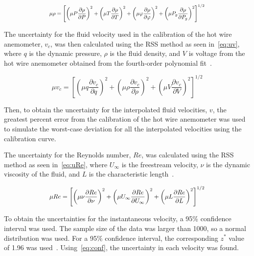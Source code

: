 \documentclass[journal,letterpaper]{IEEEtran}
\begin{document}
\begin{equation} \label{eq:uRho}
    \resizebox{227pt}{!}{$\displaystyle{\mu \rho = \left[\left(\mu P \frac{\partial \rho}{\partial P}\right)^2 + \left(\mu T \frac{\partial \rho}{\partial T}\right)^2 + \left(\mu \varphi \frac{\partial \rho}{\partial \varphi}\right)^2 + \left(\mu P_g \frac{\partial \rho}{\partial P_g}\right)^2\right]^{1/2}}$}
\end{equation}

The uncertainty for the fluid velocity used in the calibration of the hot wire anemometer, $v_c$, was then calculated using the RSS method as seen in~\eqref{eq:uv}, where $q$ is the dynamic pressure, $\rho$ is the fluid density, and $V$ is voltage from the hot wire anemometer obtained from the fourth-order polynomial fit~\cite{MoMLecture}.

\begin{equation} \label{eq:uv}
    \mu v_c = \left[\left(\mu q \frac{\partial v_c}{\partial q}\right)^2 + \left(\mu \rho \frac{\partial v_c}{\partial \rho}\right)^2 + \left(\mu V \frac{\partial v_c}{\partial V}\right)^2\right]^{1/2}
\end{equation}

Then, to obtain the uncertainty for the interpolated fluid velocities, $v$, the greatest percent error from the calibration of the hot wire anemometer was used to simulate the worst-case deviation for all the interpolated velocities using the calibration curve.

The uncertainty for the Reynolds number, $Re$, was calculated using the RSS method as seen in~\eqref{eq:uRe}, where $U_\infty$ is the freestream velocity, $\nu$ is the dynamic viscosity of the fluid, and $L$ is the characteristic length~\cite{HeatTrans}.

\begin{equation} \label{eq:uRe}
    \resizebox{227pt}{!}{$\displaystyle{\mu Re = \left[\left(\mu \nu \frac{\partial Re}{\partial \nu}\right)^2 + \left(\mu U_\infty \frac{\partial Re}{\partial U_\infty}\right)^2 + \left(\mu L \frac{\partial Re}{\partial L}\right)^2\right]^{1/2}}$}
\end{equation}

To obtain the uncertainties for the instantaneous velocity, a 95\% confidence interval was used.
The sample size of the data was larger than 1000, so a normal distribution was used.
For a 95\% confidence interval, the corresponding $z^*$ value of 1.96 was used~\cite{MoMLecture}.
Using~\eqref{eq:conf}, the uncertainty in each velocity was found.
\end{document}
